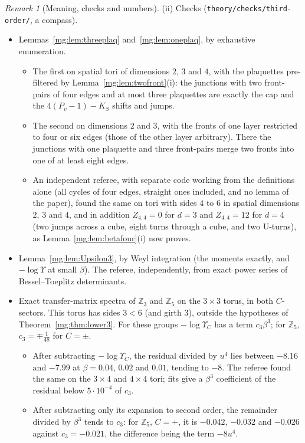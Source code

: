 \documentclass[11pt,a4paper]{article}
\theoremstyle{definition}
\theoremstyle{remark}
\newtheorem{remark}[theorem]{Remark}
\begin{document}
\begin{remark}[Meaning, checks and numbers]
(ii) Checks (\texttt{theory/checks/third-order/}, a compass).
\begin{itemize}
\item Lemmas~\ref{mg:lem:threeplaq} and~\ref{mg:lem:oneplaq}, by exhaustive enumeration.
\begin{itemize}
\item The first on spatial tori of dimensions $2$, $3$ and $4$, with the plaquettes pre-filtered by Lemma~\ref{mg:lem:twofront}(i): the junctions with two
front-pairs of four edges and at most three plaquettes are exactly the cap and the $4(P_v-1)-K_S$ shifts and jumps.
\item The second on dimensions $2$ and $3$, with the fronts of one layer restricted to four or six edges (those of the other layer arbitrary). There the
junctions with one plaquette and three front-pairs merge two fronts into one of at least eight edges.
\item An independent referee, with separate code working from the definitions alone (all cycles of four edges, straight ones included, and no lemma of the
paper), found the same on tori with sides $4$ to $6$ in spatial dimensions $2$, $3$ and $4$, and in addition $Z_{4,4}=0$ for $d=3$ and $Z_{4,4}=12$ for $d=4$ (two
jumps across a cube, eight turns through a cube, and two U-turns), as Lemma~\ref{mg:lem:betafour}(i) now proves.
\end{itemize}
\item Lemma~\ref{mg:lem:Upsilon3}, by Weyl integration (the moments exactly, and $-\log\Upsilon$ at small $\beta$). The referee, independently, from exact power
series of Bessel--Toeplitz determinants.
\item Exact transfer-matrix spectra of $\mathbb Z_3$ and $\mathbb Z_5$ on the $3\times3$ torus, in both $C$-sectors. This torus has sides $3<6$ (and girth $3$),
outside the hypotheses of Theorem~\ref{mg:thm:lower3}. For these groups $-\log\Upsilon_C$ has a term $c_3\beta^3$; for $\mathbb Z_5$, $c_3=\mp\frac1{48}$ for $C=\pm$.
\begin{itemize}
\item After subtracting $-\log\Upsilon_C$, the residual divided by $u^4$ lies between $-8.16$ and $-7.99$ at $\beta=0.04$, $0.02$ and $0.01$, tending to $-8$. The
referee found the same on the $3\times4$ and $4\times4$ tori; fits give a $\beta^3$ coefficient of the residual below $5\cdot10^{-4}$ of $c_3$.
\item After subtracting only its expansion to second order, the remainder divided by $\beta^3$ tends to $c_3$: for $\mathbb Z_5$, $C=+$, it is $-0.042$, $-0.032$ and
$-0.026$ against $c_3=-0.021$, the difference being the term $-8u^4$.
\end{itemize}
\end{itemize}


\end{remark}
\end{document}
